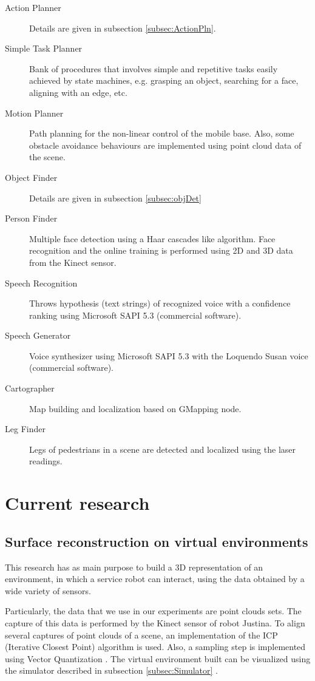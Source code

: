 \documentclass{llncs}
\begin{document}
\begin{description}
	\item[Action Planner] Details are given in subsection \ref{subsec:ActionPln}. 
	\item[Simple Task Planner] Bank of procedures that involves simple and repetitive tasks easily achieved by state machines, e.g. grasping an object, searching for a face, aligning with an edge, etc.
	\item[Motion Planner] Path planning for the non-linear control of the mobile base. Also, some obstacle avoidance behaviours are implemented using point cloud data of the scene. 
	\item[Object Finder] Details are given in subsection \ref{subsec:objDet}
	\item[Person Finder] Multiple face detection using a Haar cascades like algorithm. Face recognition and the online training is performed using 2D and 3D data from the Kinect sensor. 
	\item[Speech Recognition] Throws hypothesis (text strings) of recognized voice with a confidence ranking using Microsoft SAPI 5.3 \cite{SAPI} (commercial software).
	\item[Speech Generator] Voice synthesizer using Microsoft SAPI 5.3 \cite{SAPI} with the Loquendo Susan voice (commercial software).
	\item[Cartographer] Map building and localization based on GMapping node.
	\item[Leg Finder] Legs of pedestrians in a scene are detected and localized using the laser readings.  
\end{description}


\section{Current research}\label{sec:CurrentResearch}

\subsection{Surface reconstruction on virtual environments}\label{subsec:SurfRecon}
This research has as main purpose to build a 3D representation of an environment, in which a service robot can interact, using the data obtained by a wide variety of sensors.

Particularly, the data that we use in our experiments are point clouds sets. The capture of this data is performed by the Kinect sensor of robot Justina. To align several captures of point clouds of a scene, an implementation of the ICP (Iterative Closest Point) algorithm is used. Also, a sampling step is implemented using Vector Quantization \cite{linde1980algorithm}. The virtual environment built can be visualized using the simulator described in subsection \ref{subsec:Simulator} . 
\end{document}
